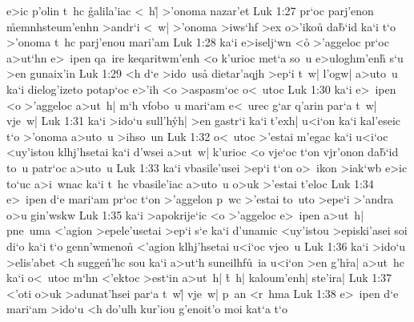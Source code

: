 e>ic
p'olin
t~hc
\r{g}alila'iac
<~h|\r{}
>'onoma
nazar'et\bibvsend
\vs Luk 1:27
pr`oc
parj'enon
\r{m}emnhsteum'enhn
>andr`i
<~w|
>'onoma
>iws`hf
>ex
o>'iko\r{u}
da\r{b}`id
ka`i
t`o
>'onoma
t~hc
parj'enou
mari'am\bibvsend
\vs Luk 1:28
ka`i
e>iselj`wn
<o\r{}
>'aggeloc
pr`oc
a>ut`hn
e>~ipen
qa~ire
keqaritwm'enh
<o
k'urioc
met`a
so~u
e>uloghm'enh\r{}
s`u
>en
gunaix'in\bibvsend
\vs Luk 1:29
<h
d`e
>ido~usa\r{}
dietar'aqjh
>ep`i
t~w|
l'ogw|
a>uto~u
ka`i
dielog'izeto
potap`oc
e>'ih
<o
>aspasm`oc
o<~utoc\bibvsend
\vs Luk 1:30
ka`i
e>~ipen
<o
>'aggeloc
a>ut~h|
m`h
vfobo~u
mari`am
e<~urec
g`ar
q'arin
par`a
t~w|
vje~w|\bibvsend
\vs Luk 1:31
ka`i
>ido`u
sull'h\r{y}h|
>en
gastr`i
ka`i
t'exh|
u<i`on
ka`i
kal'eseic
t`o
>'onoma
a>uto~u
>ihso~un\bibvsend
\vs Luk 1:32
o<~utoc
>'estai
m'egac
ka`i
u<i`oc
<uy'istou
klhj'hsetai
ka`i
d'wsei
a>ut~w|
k'urioc
<o
vje`oc
t`on
vjr'onon
da\r{b}`id
to~u
patr`oc
a>uto~u\bibvsend
\vs Luk 1:33
ka`i
vbasile'usei
>ep`i
t`on
o>~ikon
>iak`wb
e>ic
to`uc
a>i~wnac
ka`i
t~hc
vbasile'iac
a>uto~u
o>uk
>'estai
t'eloc\bibvsend
\vs Luk 1:34
e>~ipen
d`e
mari`am
pr`oc
t`on
>'aggelon
p~wc
>'estai
to~uto
>epe`i
>'andra
o>u
gin'wskw\bibvsend
\vs Luk 1:35
ka`i
>apokrije`ic
<o
>'aggeloc
e>~ipen
a>ut~h|
pne~uma
<'agion
>epele'usetai
>ep`i
s`e
ka`i
d'unamic
<uy'istou
>episki'asei
soi
di`o
ka`i
t`o
genn'wmeno\r{n}
<'agion
klhj'hsetai
u<i`oc
vjeo~u\bibvsend
\vs Luk 1:36
ka`i
>ido`u
>elis'abet
<h
sugge\r{n}'hc
sou
ka`i
a>ut`h
suneilhf\r{u}~ia
u<i`on
>en
g'h\r{r}a|
a>ut~hc
ka`i
o<~utoc
m`hn
<'ektoc
>est`in
a>ut~h|
\r{t}~h|
kaloum'enh|
ste'ira|\bibvsend
\vs Luk 1:37
<'oti
o>uk
>adunat'hsei
par`a
t~w|\r{}
vje~w|
p~an
<r~hma\bibvsend
\vs Luk 1:38
e>~ipen
d`e
mari`am
>ido`u
<h
do'ulh
kur'iou
g'enoit'o
moi
kat`a
t`o

